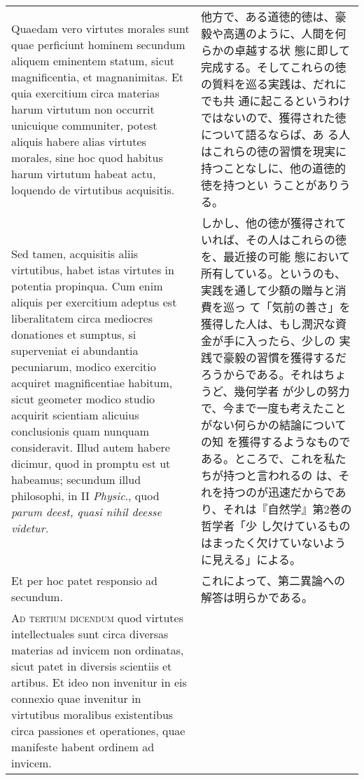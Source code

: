 \documentclass[10pt]{jsarticle}
\begin{document}
\begin{longtable}{p{21em}p{21em}}
\\

Quaedam vero virtutes morales sunt quae perficiunt hominem secundum
aliquem eminentem statum, sicut magnificentia, et magnanimitas. Et
quia exercitium circa materias harum virtutum non occurrit unicuique
communiter, potest aliquis habere alias virtutes morales, sine hoc
quod habitus harum virtutum habeat actu, loquendo de virtutibus
acquisitis.

&

 他方で、ある道徳的徳は、豪毅や高邁のように、人間を何らかの卓越する状
 態に即して完成する。そしてこれらの徳の質料を巡る実践は、だれにでも共
 通に起こるというわけではないので、獲得された徳について語るならば、あ
 る人はこれらの徳の習慣を現実に持つことなしに、他の道徳的徳を持つとい
 うことがありうる。

\\

 Sed tamen, acquisitis aliis virtutibus, habet istas virtutes in
potentia propinqua. Cum enim aliquis per exercitium adeptus est
liberalitatem circa mediocres donationes et sumptus, si superveniat ei
abundantia pecuniarum, modico exercitio acquiret magnificentiae
habitum, sicut geometer modico studio acquirit scientiam alicuius
conclusionis quam nunquam consideravit. Illud autem habere dicimur,
quod in promptu est ut habeamus; secundum illud philosophi, in II
{\itshape Physic}., quod {\itshape parum deest, quasi nihil deesse
videtur.}

&

 しかし、他の徳が獲得されていれば、その人はこれらの徳を、最近接の可能
 態において所有している。というのも、実践を通して少額の贈与と消費を巡っ
 て「気前の善さ」を獲得した人は、もし潤沢な資金が手に入ったら、少しの
 実践で豪毅の習慣を獲得するだろうからである。それはちょうど、幾何学者
 が少しの努力で、今まで一度も考えたことがない何らかの結論についての知
 を獲得するようなものである。ところで、これを私たちが持つと言われるの
 は、それを持つのが迅速だからであり、それは『自然学』第2巻の哲学者「少
 し欠けているものはまったく欠けていないように見える」による。
 

\\


Et per hoc patet responsio ad secundum.

&

 これによって、第二異論への解答は明らかである。

\\


{\scshape Ad tertium dicendum} quod virtutes intellectuales sunt circa
diversas materias ad invicem non ordinatas, sicut patet in diversis
scientiis et artibus. Et ideo non invenitur in eis connexio quae
invenitur in virtutibus moralibus existentibus circa passiones et
 operationes, quae manifeste habent ordinem ad invicem.


\end{longtable}
\end{document}
